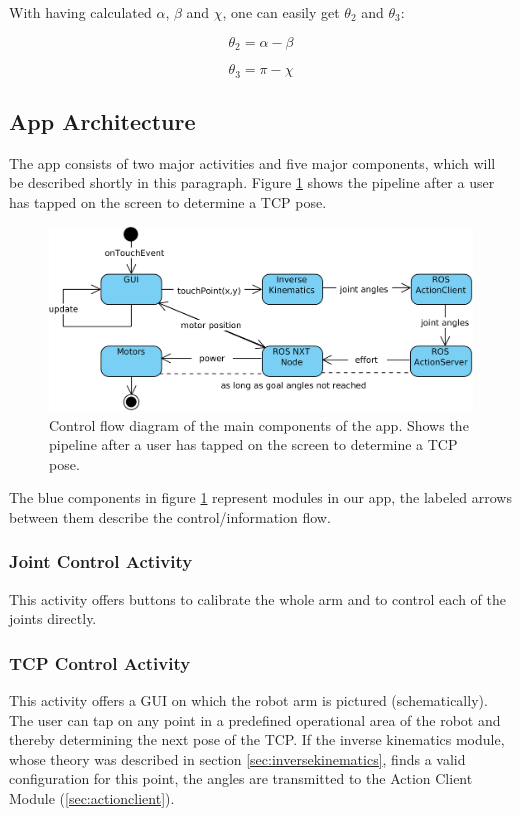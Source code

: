 \documentclass[conference]{IEEEtran}
\begin{document}
With having calculated $\alpha$, $\beta$ and $\chi$, one can easily get $\theta_2$ and $\theta_3$:

\begin{equation}
\theta_2 = \alpha - \beta
\end{equation}

\begin{equation}
\theta_3 = \pi - \chi
\end{equation}

\subsection{App Architecture}\label{sec:architecture}
The app consists of two major activities and five major components, which will be described shortly in this paragraph. Figure \ref{fig:app_pipeline} shows the pipeline after a user has tapped on the screen to determine a TCP pose.

\begin{figure}[htbp]
	\centerline{\includegraphics[scale=0.15]{img/app_pipeline.png}}
	\caption{Control flow diagram of the main components of the app. Shows the pipeline after a user has tapped on the screen to determine a TCP pose.}
	\label{fig:app_pipeline}
\end{figure}

The blue components in figure \ref{fig:app_pipeline} represent modules in our app, the labeled arrows between them describe the control/information flow.

\subsubsection{Joint Control Activity}
This activity offers buttons to calibrate the whole arm and to control each of the joints directly.

\subsubsection{TCP Control Activity}
This activity offers a GUI on which the robot arm is pictured (schematically). The user can tap on any point in a predefined operational area of the robot and thereby determining the next pose of the TCP. If the inverse kinematics module, whose theory was described in section \ref{sec:inversekinematics}, finds a valid configuration for this point, the angles are transmitted to the Action Client Module (\ref{sec:actionclient}).
\end{document}
